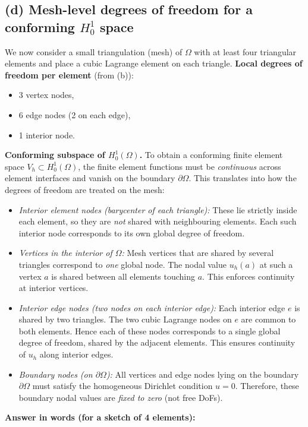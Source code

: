 \subsection*{(d) Mesh-level degrees of freedom for a conforming $H^1_0$ space}
We now consider a small triangulation (mesh) of $\Omega$ with at least four triangular
elements and place a cubic Lagrange element on each triangle.
\textbf{Local degrees of freedom per element} (from (b)):
\begin{itemize}
    \item 3 vertex nodes,
    \item 6 edge nodes (2 on each edge),
    \item 1 interior node.
\end{itemize}
\textbf{Conforming subspace of $H^1_0(\Omega)$.}
To obtain a conforming finite element space $V_h \subset H^1_0(\Omega)$, the finite element functions must be \emph{continuous} across element interfaces and vanish on the boundary $\partial\Omega$.
This translates into how the degrees of freedom are treated on the mesh:
\begin{itemize}
    \item \emph{Interior element nodes (barycenter of each triangle):}
          These lie strictly inside each element, so they are \emph{not} shared with neighbouring elements. Each such interior node corresponds to its own global degree of freedom.
    \item \emph{Vertices in the interior of $\Omega$:}
          Mesh vertices that are shared by several triangles correspond to \emph{one} global node.
          The nodal value $u_h(a)$ at such a vertex $a$ is shared between all elements touching $a$. This enforces continuity at interior vertices.
    \item \emph{Interior edge nodes (two nodes on each interior edge):}
          Each interior edge $e$ is shared by two triangles. The two cubic Lagrange nodes on $e$ are common to both elements.
          Hence each of these nodes corresponds to a single global degree of freedom, shared by the adjacent elements.
          This ensures continuity of $u_h$ along interior edges.
    \item \emph{Boundary nodes (on $\partial\Omega$):}
          All vertices and edge nodes lying on the boundary $\partial\Omega$ must satisfy the homogeneous Dirichlet condition $u=0$.
          Therefore, these boundary nodal values are \emph{fixed to zero} (not free DoFs).
\end{itemize}
\textbf{Answer in words (for a sketch of 4 elements):}
